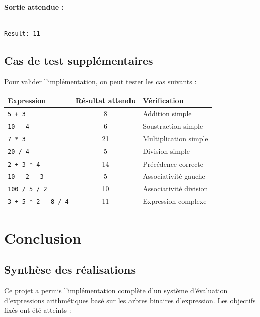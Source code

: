 \documentclass[12pt,a4paper]{article}
\begin{document}
\textbf{Sortie attendue :}
\begin{verbatim}

Result: 11
\end{verbatim}

\subsection{Cas de test supplémentaires}

Pour valider l'implémentation, on peut tester les cas suivants :

\begin{center}
\begin{tabular}{|l|c|l|}
\hline
\textbf{Expression} & \textbf{Résultat attendu} & \textbf{Vérification} \\
\hline
\texttt{5 + 3} & 8 & Addition simple \\
\hline
\texttt{10 - 4} & 6 & Soustraction simple \\
\hline
\texttt{7 * 3} & 21 & Multiplication simple \\
\hline
\texttt{20 / 4} & 5 & Division simple \\
\hline
\texttt{2 + 3 * 4} & 14 & Précédence correcte \\
\hline
\texttt{10 - 2 - 3} & 5 & Associativité gauche \\
\hline
\texttt{100 / 5 / 2} & 10 & Associativité division \\
\hline
\texttt{3 + 5 * 2 - 8 / 4} & 11 & Expression complexe \\
\hline
\end{tabular}
\end{center}


\section{Conclusion}

\subsection{Synthèse des réalisations}

Ce projet a permis l'implémentation complète d'un système d'évaluation d'expressions arithmétiques basé sur les arbres binaires d'expression. Les objectifs fixés ont été atteints :
\end{document}

